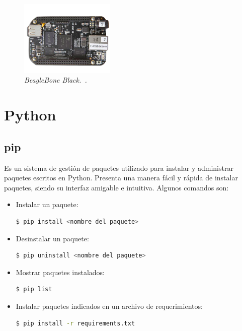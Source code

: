 \begin{figure}[h!]
  \centering
  \includegraphics[width=0.4\textwidth, keepaspectratio]{images/bbb}
  \caption{\textit{BeagleBone Black.~\cite{BeagleB}.}}
  \label{fig:bbb}
\end{figure}

\section{Python}
\subsection{pip}
Es un sistema de gestión de paquetes utilizado para instalar y administrar paquetes escritos en Python. Presenta una manera fácil y rápida de instalar paquetes, siendo su interfaz amigable e intuitiva. Algunos comandos son:

\begin{itemize}
\item Instalar un paquete:
\begin{lstlisting}[language=bash]
  $ pip install <nombre del paquete>
\end{lstlisting}	

\item Desinstalar un paquete:
\begin{lstlisting}[language=bash]
  $ pip uninstall <nombre del paquete>
\end{lstlisting}
	

\item Mostrar paquetes instalados:
\begin{lstlisting}[language=bash]
  $ pip list
\end{lstlisting}
	

\item Instalar paquetes indicados en un archivo de requerimientos:
\begin{lstlisting}[language=bash]
  $ pip install -r requirements.txt
\end{lstlisting}

\end{itemize}

